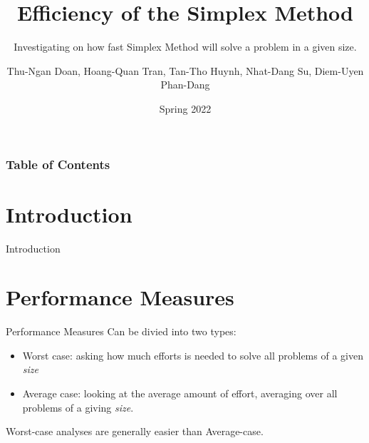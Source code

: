 \documentclass[10pt]{beamer}
\begin{document}
\author{Thu-Ngan Doan, Hoang-Quan Tran, Tan-Tho Huynh, Nhat-Dang Su, Diem-Uyen Phan-Dang}
\title{Efficiency of the Simplex Method}
\subtitle{Investigating on how fast Simplex Method will solve a problem in a given size.}
\date{Spring 2022}
\subject{CSC10104 - Linear Programming}


\begin{frame}[plain]
\maketitle
\end{frame}

\begin{frame}
\frametitle{Table of Contents}
\tableofcontents
\end{frame}

\section{Introduction}
\begin{frame}{Introduction}

\end{frame}

\section{Performance Measures}
\begin{frame}{Performance Measures}
Can be divied into two types:
\begin{itemize}
\item Worst case: asking how much efforts is needed to solve all problems of a given \textit{size}
\item Average case: looking at the average amount of effort, averaging over all problems of a giving \textit{size}. 
\end{itemize}
Worst-case analyses are generally easier than Average-case.
\end{frame}
\end{document}
